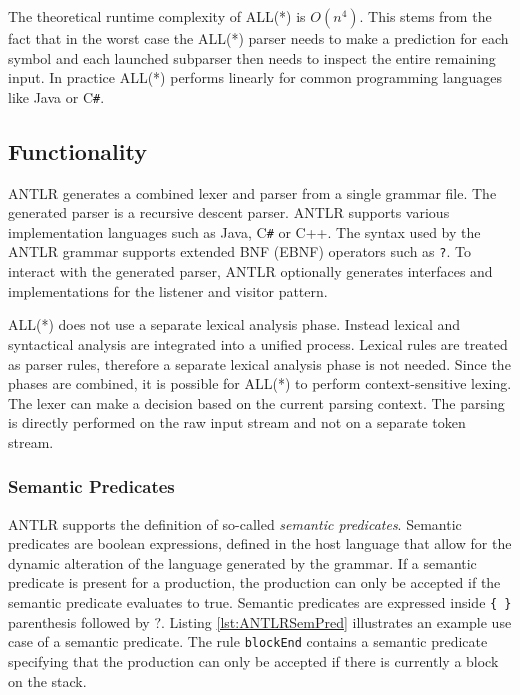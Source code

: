 The theoretical runtime complexity of ALL(*) is $O(n^4)$. This stems from the fact that in the worst case the ALL(*) parser needs to make a prediction for each symbol and each launched subparser then needs to inspect the entire remaining input. In practice ALL(*) performs linearly for common programming languages like Java or C\verb|#|.


\subsection{Functionality}

ANTLR generates a combined lexer and parser from a single grammar file. The generated parser is a recursive descent parser. ANTLR supports various implementation languages such as Java, C\verb|#| or C++. The syntax used by the ANTLR grammar supports extended BNF (EBNF) operators such as \texttt{?}. To interact with the generated parser, ANTLR optionally generates interfaces and implementations for the listener and visitor pattern.

ALL(*) does not use a separate lexical analysis phase. Instead lexical and syntactical analysis are integrated into a unified process. Lexical rules are treated as parser rules, therefore a separate lexical analysis phase is not needed. Since the phases are combined, it is possible for ALL(*) to perform context-sensitive lexing. The lexer can make a decision based on the current parsing context. The parsing is directly performed on the raw input stream and not on a separate token stream. 

\subsubsection{Semantic Predicates}

ANTLR supports the definition of so-called \textit{semantic predicates}. Semantic predicates are boolean expressions, defined in the host language that allow for the dynamic alteration of the language generated by the grammar. If a semantic predicate is present for a production, the production can only be accepted if the semantic predicate evaluates to true. Semantic predicates are expressed inside \verb|{ }| parenthesis followed by $?$. Listing \ref{lst:ANTLRSemPred} illustrates an example use case of a semantic predicate. The rule \texttt{blockEnd} contains a semantic predicate specifying that the production can only be accepted if there is currently a block on the stack. 

